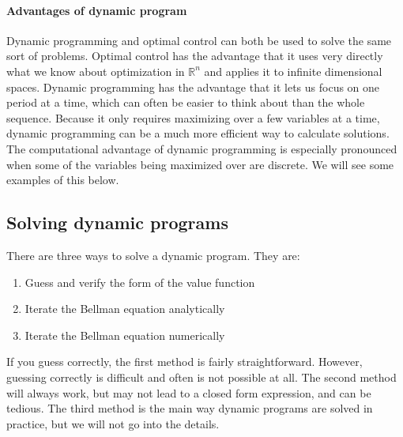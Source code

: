 \documentclass[12pt,reqno]{amsart}
\theoremstyle{definition}
\def\R{\mathbb{R}}
\begin{document}
\paragraph{Advantages of dynamic program} 
Dynamic programming and optimal control can both be used to solve the
same sort of problems. Optimal control has the advantage that it uses
very directly what we know about optimization in $\R^n$ and applies it
to infinite dimensional spaces. Dynamic programming has the advantage
that it lets us focus on one period at a time, which can often be
easier to think about than the whole sequence. Because it only
requires maximizing over a few variables at a time, dynamic
programming can be a much more efficient way to calculate
solutions. The computational advantage of dynamic programming is
especially pronounced when some of the variables being maximized over
are discrete. We will see some examples of this below. 


\subsection{Solving dynamic programs} 

There are three ways to solve a dynamic program. They are:
\begin{enumerate}
\item Guess and verify the form of the value function
\item Iterate the Bellman equation analytically
\item Iterate the Bellman equation numerically
\end{enumerate}
If you guess correctly, the first method is fairly
straightforward. However, guessing correctly is difficult and often is
not possible at all. The second method will always work, but may not
lead to a closed form expression, and can be tedious. The third method
is the main way dynamic programs are solved in practice, but we will
not go into the details.
\end{document}
